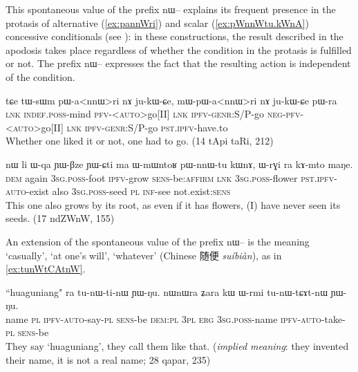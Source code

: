 \documentclass[oldfontcommands,oneside,a4paper,11pt]{article}
\newcommand{\ipa}[1]{{\phon \mbox{#1}}} %
\newcommand{\zh}[1]{{\cn #1}}
\begin{document}
This spontaneous value of the prefix \ipa{nɯ--}  explains its frequent presence in the protasis of alternative  (\ref{ex:pannWri}) and scalar (\ref{ex:pWnnWtu.kWnA})  concessive conditionals (see \citealt{jacques14linking}): in these constructions, the result described in the apodosis takes place regardless of whether the condition in the protasis is fulfilled or not. The prefix \ipa{nɯ--} expresses the fact that the resulting action is independent of the condition.

\begin{exe}
\ex  \label{ex:pannWri}
\gll
\ipa{tɕe}  	\ipa{tɯ-sɯm}  	\ipa{pɯ-a<nnɯ>ri}  	\ipa{nɤ}  	\ipa{ju-kɯ-ɕe,}  \ipa{mɯ-pɯ-a<nnɯ>ri}  	\ipa{nɤ}  	\ipa{ju-kɯ-ɕe}  	\ipa{pɯ-ra}  \\
\textsc{lnk} \textsc{indef.poss}-mind  \textsc{pfv-<auto>}go[II] \textsc{lnk} \textsc{ipfv-genr}:S/P-go \textsc{neg-pfv-<auto>}go[II] \textsc{lnk} \textsc{ipfv-genr}:S/P-go \textsc{pst.ipfv}-have.to \\
\glt Whether one liked it or not, one had to go. (14 tApi taRi, 212)
\end{exe}


 \begin{exe}
\ex  \label{ex:pWnnWtu.kWnA}
\gll
\ipa{nɯ}    	\ipa{li}    	\ipa{ɯ-qa}    	\ipa{ɲɯ-βze}    	\ipa{ɲɯ-ɕti}    	\ipa{ma}    	\ipa{ɯ-mɯntoʁ}    	\ipa{pɯ-nnɯ-tu}    	\ipa{kɯnɤ,}    	\ipa{ɯ-rɣi}    	\ipa{ra}    	\ipa{kɤ-mto}    	\ipa{maŋe.}    \\
\textsc{dem} again \textsc{3sg.poss}-foot \textsc{ipfv}-grow \textsc{sens}-be:\textsc{affirm} \textsc{lnk} \textsc{3sg.poss}-flower \textsc{pst.ipfv-auto}-exist also \textsc{3sg.poss}-seed \textsc{pl} \textsc{inf}-see not.exist:\textsc{sens} \\
\glt This one also grows by its root, as even if it has flowers, (I) have never seen its seeds. (17 ndZWnW, 155)
\end{exe}


An extension of the spontaneous value of the prefix \ipa{nɯ--} is the meaning `casually', `at one's will', `whatever' (Chinese \zh{随便} \textit{suíbiàn}), as in \ref{ex:tunWtCAtnW}. 

\begin{exe}
\ex \label{ex:tunWtCAtnW}
\gll
``huaguniang" \ipa{ra}  	\ipa{tu-nɯ-ti-nɯ}  	\ipa{ɲɯ-ŋu.}  	\ipa{nɯnɯra}  	\ipa{ʑara}  	\ipa{kɯ}  	\ipa{ɯ-rmi}  	\ipa{tu-nɯ-tɕɤt-nɯ}  	\ipa{ɲɯ-ŋu.}  \\
name \textsc{pl}	\textsc{ipfv-auto}-say-\textsc{pl}	\textsc{sens}-be	\textsc{dem:pl}	\textsc{3pl}	\textsc{erg}	\textsc{3sg.poss}-name	\textsc{ipfv-auto}-take-\textsc{pl}	\textsc{sens}-be\\
\glt They say `huaguniang', they call them like that. (\textit{implied meaning}: they invented their name, it is not a real name; 28 qapar, 235)
\end{exe}
\end{document}
